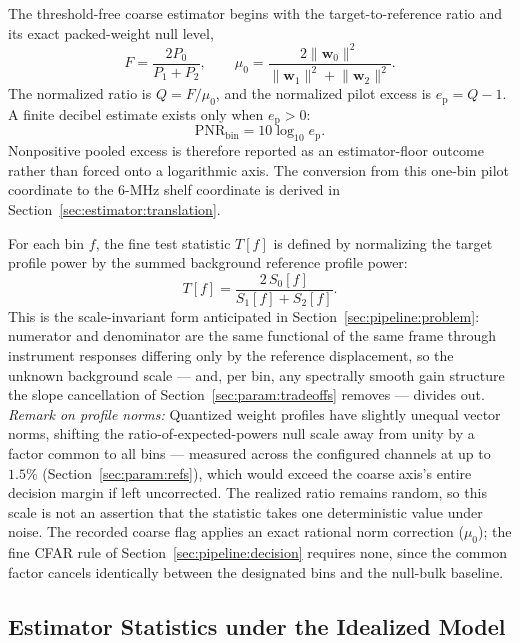 The threshold-free coarse estimator begins with the target-to-reference ratio and its exact packed-weight null level,
\begin{equation}
F = \frac{2P_0}{P_1+P_2},
\qquad
\mu_0 = \frac{2\lVert\mathbf{w}_0\rVert^2}{\lVert\mathbf{w}_1\rVert^2+\lVert\mathbf{w}_2\rVert^2}.
\end{equation}
The normalized ratio is $Q=F/\mu_0$, and the normalized pilot excess is $e_{\mathrm p}=Q-1$. A finite decibel estimate exists only when $e_{\mathrm p}>0$:
\begin{equation}
\mathrm{PNR}_{\mathrm{bin}}=10\log_{10}e_{\mathrm p}.
\label{eq:estimator:pilot-excess}
\end{equation}
Nonpositive pooled excess is therefore reported as an estimator-floor outcome rather than forced onto a logarithmic axis. The conversion from this one-bin pilot coordinate to the 6-MHz shelf coordinate is derived in Section~\ref{sec:estimator:translation}.

For each bin $f$, the fine test statistic $T[f]$ is defined by normalizing the target profile power by the summed background reference profile power:
\begin{equation}
T[f] = \frac{2\, S_0[f]}{S_1[f] + S_2[f]}.
\end{equation}
This is the scale-invariant form anticipated in Section~\ref{sec:pipeline:problem}: numerator and denominator are the same functional of the same frame through instrument responses differing only by the reference displacement, so the unknown background scale --- and, per bin, any spectrally smooth gain structure the slope cancellation of Section~\ref{sec:param:tradeoffs} removes --- divides out. \textit{Remark on profile norms:} Quantized weight profiles have slightly unequal vector norms, shifting the ratio-of-expected-powers null scale away from unity by a factor common to all bins --- measured across the configured channels at up to $1.5\%$ (Section~\ref{sec:param:refs}), which would exceed the coarse axis's entire decision margin if left uncorrected. The realized ratio remains random, so this scale is not an assertion that the statistic takes one deterministic value under noise. The recorded coarse flag applies an exact rational norm correction ($\mu_0$); the fine CFAR rule of Section~\ref{sec:pipeline:decision} requires none, since the common factor cancels identically between the designated bins and the null-bulk baseline.

\subsection{Estimator Statistics under the Idealized Model}
\label{sec:estimator:statistics}

